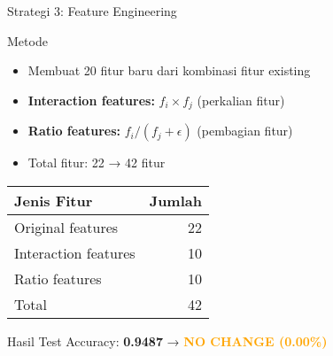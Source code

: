 \documentclass[aspectratio=169]{beamer}
\begin{document}
\begin{frame}{Strategi 3: Feature Engineering}
\begin{block}{Metode}
\begin{itemize}
    \item Membuat 20 fitur baru dari kombinasi fitur existing
    \item \textbf{Interaction features:} $f_i \times f_j$ (perkalian fitur)
    \item \textbf{Ratio features:} $f_i / (f_j + \epsilon)$ (pembagian fitur)
    \item Total fitur: 22 → 42 fitur
\end{itemize}
\end{block}

\begin{table}
\centering
\small
\begin{tabular}{lr}
\toprule
\textbf{Jenis Fitur} & \textbf{Jumlah} \\
\midrule
Original features & 22 \\
Interaction features & 10 \\
Ratio features & 10 \\
\midrule
Total & 42 \\
\bottomrule
\end{tabular}
\end{table}

\begin{alertblock}{Hasil}
Test Accuracy: \textbf{0.9487} → \textcolor{orange}{\textbf{NO CHANGE (0.00\%)}}
\end{alertblock}
\end{frame}
\end{document}
